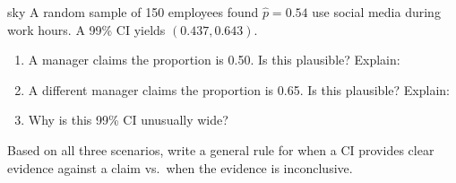 \documentclass[10pt]{article}
\begin{document}
\begin{scenariobox}{sky}
A random sample of 150 employees found $\hat p = 0.54$ use social media during work hours.
A 99\% CI yields $(0.437, 0.643)$.

\begin{enumerate}[label=\alph*.]
  \item A manager claims the proportion is 0.50. Is this plausible?  Explain: 

  \item A different manager claims the proportion is 0.65. Is this plausible?  Explain: 

  \item Why is this 99\% CI unusually wide?
\end{enumerate}
\end{scenariobox}

\begin{reflectionbox}
Based on all three scenarios, write a general rule for when a CI provides clear evidence
against a claim vs.\ when the evidence is inconclusive.

\end{reflectionbox}
\end{document}
